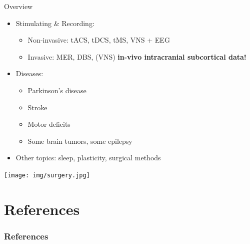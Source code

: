 \documentclass[10pt]{beamer}
\begin{document}
\begin{frame}{Overview}
\begin{itemize}
  \item Stimulating \& Recording:
  \begin{itemize}
  \item Non-invasive: tACS, tDCS, tMS, VNS + EEG
  \item Invasive: MER, DBS, (VNS) \hfill \textbf{in-vivo intracranial subcortical data!}
  \end{itemize}
  \item Diseases:
  \begin{itemize}
   \item Parkinson's disease
   \item Stroke
   \item Motor deficits
   \item Some brain tumors, some epilepsy
  \end{itemize}
  \item Other topics: sleep, plasticity, surgical methods
\end{itemize}
\end{frame}

\begin{frame}
 \begin{center}
  \texttt{[image: img/surgery.jpg]}
 \end{center}

\end{frame}

     
\section{References}
    \begin{frame}[allowframebreaks]
      \frametitle{References}
      \begin{tiny}
      \nocite{*}
      \printbibliography
      \end{tiny}
    \end{frame}

\appendix
\end{document}
